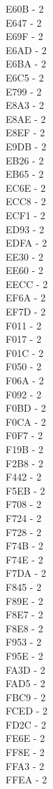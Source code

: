 \documentclass[10pt,letterpaper]{article}
\begin{document}
E60B -  2\\
E647 -  2\\
E69F -  2\\
E6AD -  2\\
E6BA -  2\\
E6C5 -  2\\
E799 -  2\\
E8A3 -  2\\
E8AE -  2\\
E8EF -  2\\
E9DB -  2\\
EB26 -  2\\
EB65 -  2\\
EC6E -  2\\
ECC8 -  2\\
ECF1 -  2\\
ED93 -  2\\
EDFA -  2\\
EE30 -  2\\
EE60 -  2\\
EECC -  2\\
EF6A -  2\\
EF7D -  2\\
F011 -  2\\
F017 -  2\\
F01C -  2\\
F050 -  2\\
F06A -  2\\
F092 -  2\\
F0BD -  2\\
F0CA -  2\\
F0F7 -  2\\
F19B -  2\\
F2B8 -  2\\
F442 -  2\\
F5EB -  2\\
F708 -  2\\
F724 -  2\\
F728 -  2\\
F74B -  2\\
F74E -  2\\
F7DA -  2\\
F845 -  2\\
F89E -  2\\
F8E7 -  2\\
F8E8 -  2\\
F953 -  2\\
F95E -  2\\
FA3D -  2\\
FAD5 -  2\\
FBC9 -  2\\
FCED -  2\\
FD2C -  2\\
FE6E -  2\\
FF8E -  2\\
FFA3 -  2\\
FFEA -  2\\
\end{document}

